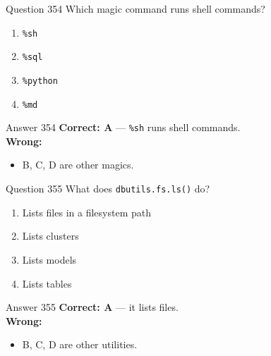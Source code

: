 \documentclass[aspectratio=169,11pt]{beamer}
\begin{document}
	\begin{frame}{Question 354}
		Which magic command runs shell commands?
		\begin{enumerate}[label=\Alph*.]
			\item \texttt{\%sh}
			\item \texttt{\%sql}
			\item \texttt{\%python}
			\item \texttt{\%md}
		\end{enumerate}
	\end{frame}
	\begin{frame}{Answer 354}
		\textbf{Correct: A} --- \texttt{\%sh} runs shell commands.\\
		\vspace{0.5em}
		\textbf{Wrong:}
		\begin{itemize}
			\item B, C, D are other magics.
		\end{itemize}
	\end{frame}
	
	\begin{frame}{Question 355}
		What does \texttt{dbutils.fs.ls()} do?
		\begin{enumerate}[label=\Alph*.]
			\item Lists files in a filesystem path
			\item Lists clusters
			\item Lists models
			\item Lists tables
		\end{enumerate}
	\end{frame}
	\begin{frame}{Answer 355}
		\textbf{Correct: A} --- it lists files.\\
		\vspace{0.5em}
		\textbf{Wrong:}
		\begin{itemize}
			\item B, C, D are other utilities.
		\end{itemize}
	\end{frame}
	
\end{document}
